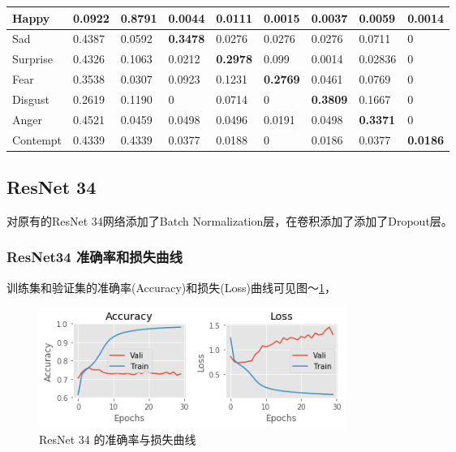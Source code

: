 \documentclass[11pt, a4paper]{article}
\begin{document}
\begin{CJK}{UTF8}{gbsn}
\begin{table}[htbp]
\begin{center}
\begin{tabular}{ | l | l | l | l | l |l | l |l | l | }
			Happy   & 0.0922  & \textbf{0.8791}  & 0.0044   & 0.0111  & 0.0015   & 0.0037  & 0.0059  &  0.0014 \\ \hline
			
			Sad    & 0.4387 & 0.0592  & \textbf{0.3478}   & 0.0276  & 0.0276   & 0.0276  & 0.0711  & 	0  \\ \hline
			
			Surprise    & 0.4326   & 0.1063  &  0.0212   & \textbf{0.2978}   & 0.099  &  0.0014  & 0.02836  &  0 \\ \hline
			
			Fear     & 0.3538  & 0.0307  &  0.0923  & 0.1231  & \textbf{0.2769}   & 0.0461  & 0.0769 & 0 \\ \hline
			
			Disgust      &  0.2619  & 0.1190  & 0    & 0.0714  & 0   & \textbf{0.3809}  &  0.1667 & 0 \\ \hline
			
			Anger       & 0.4521   & 0.0459  & 0.0498   & 0.0496  & 0.0191   & 0.0498  & \textbf{0.3371} &  0 \\ \hline
			
			Contempt   & 0.4339  & 0.4339  &  0.0377  & 0.0188  & 0  & 0.0186 &  0.0377 & \textbf{0.0186} \\ \hline
		\end{tabular}
		\label{tab:res18_cm}
	\end{center}
\end{table}	




\subsection{ResNet 34}
对原有的ResNet 34网络添加了Batch Normalization层，在卷积添加了添加了Dropout层。

\subsubsection{ResNet34 准确率和损失曲线}
训练集和验证集的准确率(Accuracy)和损失(Loss)曲线可见图～\ref{fig:res34_loss}，

\begin{figure}[htbp]
	\centering %
	
	\includegraphics[width=10cm]{res34}
	\caption{ResNet 34 的准确率与损失曲线}
	\label{fig:res34_loss}
\end{figure}


\end{CJK}
\end{document}

